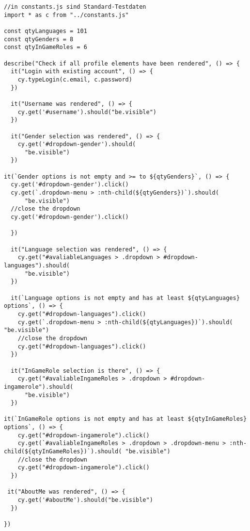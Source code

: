 \begin{lstlisting}
//in constants.js sind Standard-Testdaten
import * as c from "../constants.js"

const qtyLanguages = 101
const qtyGenders = 8
const qtyInGameRoles = 6

describe("Check if all profile elements have been rendered", () => {
  it("Login with existing account", () => {
    cy.typeLogin(c.email, c.password)
  })

  it("Username was rendered", () => {
    cy.get('#username').should("be.visible")
  })

  it("Gender selection was rendered", () => {
    cy.get('#dropdown-gender').should(
      "be.visible")
  })

it(`Gender options is not empty and >= to ${qtyGenders}`, () => {
  cy.get('#dropdown-gender').click()
  cy.get(`.dropdown-menu > :nth-child(${qtyGenders})`).should(
      "be.visible")
  //close the dropdown
  cy.get('#dropdown-gender').click()

  })

  it("Language selection was rendered", () => {
    cy.get("#avaliableLanguages > .dropdown > #dropdown-languages").should(
      "be.visible")
  })

  it(`Language options is not empty and has at least ${qtyLanguages} options`, () => {
    cy.get("#dropdown-languages").click()
    cy.get(`.dropdown-menu > :nth-child(${qtyLanguages})`).should( "be.visible")
    //close the dropdown
    cy.get("#dropdown-languages").click()
  })

  it("InGameRole selection is there", () => {
    cy.get("#avaliableIngameRoles > .dropdown > #dropdown-ingamerole").should(
      "be.visible")
  })

it(`InGameRole options is not empty and has at least ${qtyInGameRoles} options`, () => {
    cy.get("#dropdown-ingamerole").click()
    cy.get(`#avaliableIngameRoles > .dropdown > .dropdown-menu > :nth-child(${qtyInGameRoles})`).should( "be.visible")
    //close the dropdown
    cy.get("#dropdown-ingamerole").click()
  })

 it("AboutMe was rendered", () => {
    cy.get('#aboutMe').should("be.visible")
  })
  
})

\end{lstlisting}



